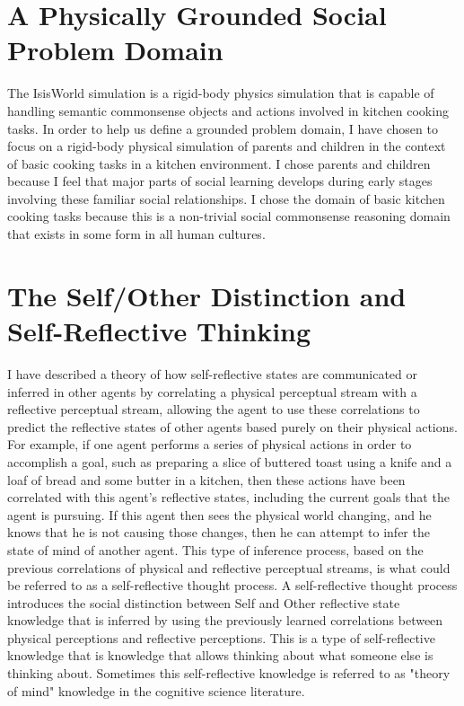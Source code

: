 \section{A Physically Grounded Social Problem Domain}

The IsisWorld simulation \cite[]{smith:2010} is a rigid-body physics
simulation that is capable of handling semantic commonsense objects
and actions involved in kitchen cooking tasks.  In order to help us
define a grounded problem domain, I have chosen to focus on a
rigid-body physical simulation of parents and children in the context
of basic cooking tasks in a kitchen environment. I chose parents and
children because I feel that major parts of social learning develops
during early stages involving these familiar social relationships. I
chose the domain of basic kitchen cooking tasks because this is a
non-trivial social commonsense reasoning domain that exists in some
form in all human cultures.

\section{The Self/Other Distinction and Self-Reflective Thinking}

I have described \cite[]{morgan:2011} a theory of how self-reflective
states are communicated or inferred in other agents by correlating a
physical perceptual stream with a reflective perceptual stream,
allowing the agent to use these correlations to predict the reflective
states of other agents based purely on their physical actions. For
example, if one agent performs a series of physical actions in order
to accomplish a goal, such as preparing a slice of buttered toast
using a knife and a loaf of bread and some butter in a kitchen, then
these actions have been correlated with this agent's reflective
states, including the current goals that the agent is pursuing. If
this agent then sees the physical world changing, and he knows that he
is not causing those changes, then he can attempt to infer the state
of mind of another agent. This type of inference process, based on the
previous correlations of physical and reflective perceptual streams,
is what could be referred to as a self-reflective thought process. A
self-reflective thought process introduces the social distinction
between Self and Other reflective state knowledge that is inferred by
using the previously learned correlations between physical perceptions
and reflective perceptions.  This is a type of self-reflective
knowledge that is knowledge that allows thinking about what someone
else is thinking about.  Sometimes this self-reflective knowledge is
referred to as "theory of mind" knowledge in the cognitive science
literature.

